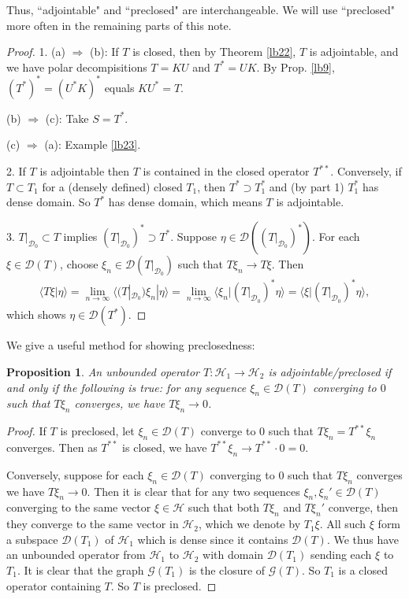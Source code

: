 \documentclass[12pt,a4paper,notitlepage]{article}
\theoremstyle{definition}
\theoremstyle{plain}
\newtheorem{pp}[df]{Proposition}
\newcommand{\mc}{\mathcal}
\newcommand{\Dom}{\scr D}
\newcommand{\bk}[1]{\langle {#1}\rangle}
\newcommand{\scr}{\mathscr}
\numberwithin{equation}{section}
\begin{document}
Thus, ``adjointable" and ``preclosed" are interchangeable. We will use ``preclosed" more often in the remaining parts of this note.


\begin{proof}
1. (a) $\Rightarrow$ (b): If $T$ is closed, then by Theorem \ref{lb22}, $T$ is adjointable, and we have polar decompisitions $T=KU$ and $T^*=UK$. By Prop. \ref{lb9}, $(T^*)^*=(U^*K)^*$ equals $KU^*=T$.

(b) $\Rightarrow$ (c):  Take $S=T^*$.

(c) $\Rightarrow$ (a): Example \ref{lb23}.

2. If $T$ is adjointable then $T$ is contained in the closed operator $T^{**}$. Conversely, if $T\subset T_1$ for a (densely defined) closed $T_1$, then $T^*\supset T_1^*$ and (by part 1) $T_1^*$ has dense domain. So $T^*$ has dense domain, which means $T$ is adjointable. 

3. $T|_{\Dom_0}\subset T$ implies $(T|_{\Dom_0})^*\supset T^*$. Suppose $\eta\in\Dom((T|_{\Dom_0})^*)$. For each $\xi\in\Dom(T)$, choose $\xi_n\in\Dom(T|_{\Dom_0})$ such that $T\xi_n\rightarrow T\xi$. Then
\begin{align*}
\bk{T\xi|\eta}=\lim_{n\rightarrow\infty}\bk{(T|_{\Dom_0})\xi_n|\eta}=\lim_{n\rightarrow\infty}\bk{\xi_n|(T|_{\Dom_0})^*\eta}=\bk{\xi|(T|_{\Dom_0})^*\eta},	
\end{align*}
which shows $\eta\in\Dom(T^*)$.
\end{proof}


We give a useful method for showing preclosedness:

\begin{pp}
An unbounded operator $T:\mc H_1\rightarrow\mc H_2$  is adjointable/preclosed if and only if the following is true: for any sequence $\xi_n\in\Dom(T)$ converging to $0$ such that $T\xi_n$ converges, we have $T\xi_n\rightarrow 0$.
\end{pp}


\begin{proof}
If $T$ is preclosed, let $\xi_n\in\Dom(T)$ converge to $0$ such that $T\xi_n=T^{**}\xi_n$ converges. Then as $T^{**}$ is closed, we have  $T^{**}\xi_n\rightarrow T^{**}\cdot 0=0$.

Conversely, suppose for each $\xi_n\in\Dom(T)$ converging to $0$ such that $T\xi_n$ converges we have $T\xi_n\rightarrow 0$. Then it is clear that for any  two sequences $\xi_n,\xi_n'\in\Dom(T)$ converging to the same vector $\xi\in\mc H$ such that both $T\xi_n$ and $T\xi_n'$ converge, then they converge to the same vector in $\mc H_2$, which we denote by $T_1\xi$. All such $\xi$ form a subspace $\Dom(T_1)$ of $\mc H_1$ which is dense since it contains $\Dom(T)$. We thus have an unbounded operator from $\mc H_1$ to $\mc H_2$ with domain $\Dom(T_1)$ sending each $\xi$ to $T_1$. It is clear that the graph $\scr G(T_1)$ is the closure of  $\scr G(T)$. So $T_1$ is a closed operator containing $T$. So $T$ is preclosed.  
\end{proof}
\end{document}
